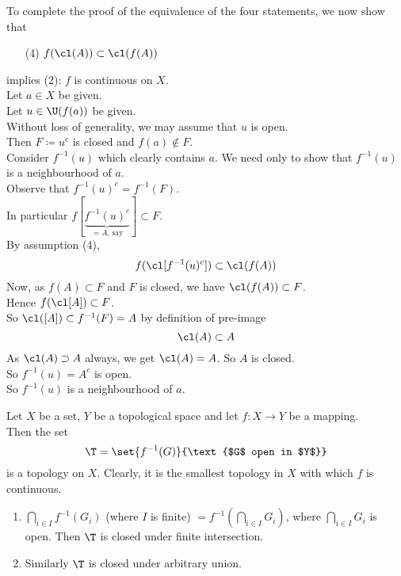 To complete the proof of the equivalence of the four statements, we now show that
\begin{enumerate}
\item[(4)] $f(\cl(A))\subset\cl(f(A))$
\end{enumerate}
implies (2): $f$ is continuous on $X$. \\
\pf Let $a\in X$ be given. \\
Let $u\in\U(f(a))$ be given. \\
Without loss of generality, we may assume that $u$ is open. \\
Then $F\coloneqq u^c$ is closed and $f(a)\notin F$. \\
Consider $f^{-1}(u)$ which clearly contains $a$.  We need only to show that $f^{-1}(u)$ is a neighbourhood of $a$. \\
Observe that $f^{-1}(u)^c=f^{-1}(F)$. \\
In particular $f[\underbrace{f^{-1}(u)^c}_{=A\text{, say}}]\subset F$. \\
By assumption (4),
\[ f(\cl[f^{-1}(u)^c]) \subset \cl(f(A)) \]
Now, as $f(A)\subset F$ and $F$ is closed,
we have $\cl(f(A))\subset F$. \\
Hence $f(\cl[A])\subset F$. \\
So $\cl([A])\subset f^{-1}(F)=A$ by definition of pre-image
\[ \cl(A)\subset A \]
As $\cl(A)\supset A$ always, we get $\cl(A)=A$.  So $A$ is closed. \\
So $f^{-1}(u)=A^c$ is open. \\
So $f^{-1}(u)$ is a neighbourhood of $a$.

\thm Let $X$ be a set, $Y$ be a topological space and let $f\colon X\to Y$ be a mapping. \\
Then the set
\[ \T = \set{f^{-1}(G)}{\text{$G$ open in $Y$}} \]
is a topology on $X$.  Clearly, it is the smallest topology in $X$ with which $f$ is continuous. \\
\begin{enumerate}[label=(\arabic*)]
\item $\bigcap_{i\in I}f^{-1}(G_i)$ (where $I$ is finite) $=f^{-1}(\bigcap_{i\in I}G_i)$, %
where $\bigcap_{i\in I}G_i$ is open.  Then $\T$ is closed under finite intersection.
\item Similarly $\T$ is closed under arbitrary union.
\end{enumerate}

